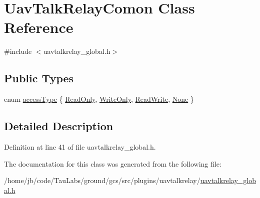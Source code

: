 \hypertarget{class_uav_talk_relay_comon}{\section{\-Uav\-Talk\-Relay\-Comon \-Class \-Reference}
\label{class_uav_talk_relay_comon}
}


{\ttfamily \#include $<$uavtalkrelay\-\_\-global.\-h$>$}

\subsection*{\-Public \-Types}
\begin{DoxyCompactItemize}
\item 
enum \hyperlink{group___u_a_v_talk_plugin_gae73e1677650d617d825cf2224fa0626a}{access\-Type} \{ \hyperlink{group___u_a_v_talk_plugin_ggae73e1677650d617d825cf2224fa0626aa957fb229d0cc0c660145b9e1287ad8e1}{\-Read\-Only}, 
\hyperlink{group___u_a_v_talk_plugin_ggae73e1677650d617d825cf2224fa0626aa024baabb3a664e953e20d4022ce393fa}{\-Write\-Only}, 
\hyperlink{group___u_a_v_talk_plugin_ggae73e1677650d617d825cf2224fa0626aacc91949972bbaf73f88f2e814994481e}{\-Read\-Write}, 
\hyperlink{group___u_a_v_talk_plugin_ggae73e1677650d617d825cf2224fa0626aa83e6c2ba48be7947d0d526ba645c6ee4}{\-None}
 \}
\end{DoxyCompactItemize}


\subsection{\-Detailed \-Description}


\-Definition at line 41 of file uavtalkrelay\-\_\-global.\-h.



\-The documentation for this class was generated from the following file\-:\begin{DoxyCompactItemize}
\item 
/home/jb/code/\-Tau\-Labs/ground/gcs/src/plugins/uavtalkrelay/\hyperlink{uavtalkrelay__global_8h}{uavtalkrelay\-\_\-global.\-h}\end{DoxyCompactItemize}
